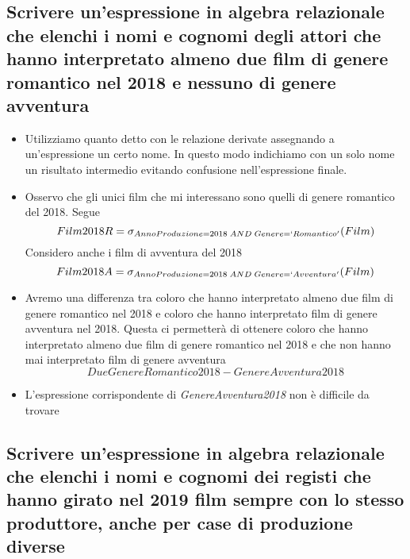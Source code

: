 \subsection*{Scrivere un'espressione in algebra relazionale che elenchi i nomi e cognomi degli attori che hanno interpretato almeno due film di genere romantico nel 2018 e nessuno di genere avventura}
\begin{itemize}
	
	\item Utilizziamo quanto detto con le relazione derivate assegnando a un'espressione un certo nome. In questo modo indichiamo con un solo nome un risultato intermedio evitando confusione nell'espressione finale.
	\item Osservo che gli unici film che mi interessano sono quelli di genere romantico del 2018. Segue
	\[Film2018R = \sigma_{AnnoProduzione = 2018\;AND\;Genere = `Romantico'}(Film)\]
	Considero anche i film di avventura del 2018
	\[Film2018A = \sigma_{AnnoProduzione = 2018\;AND\;Genere = `Avventura'}(Film)\]
	\item Avremo una differenza tra coloro che hanno interpretato almeno due film di genere romantico nel 2018 e coloro che hanno interpretato film di genere avventura nel 2018. Questa ci permetterà di ottenere coloro che hanno interpretato almeno due film di genere romantico nel 2018 e che non hanno mai interpretato film di genere avventura
	\[DueGenereRomantico2018-GenereAvventura2018\]
	\item L'espressione corrispondente di \emph{GenereAvventura2018} non è difficile da trovare
\end{itemize}

\subsection*{Scrivere un'espressione in algebra relazionale che elenchi i nomi e cognomi dei registi che hanno girato nel 2019 film sempre con lo stesso produttore, anche per case di produzione diverse}

